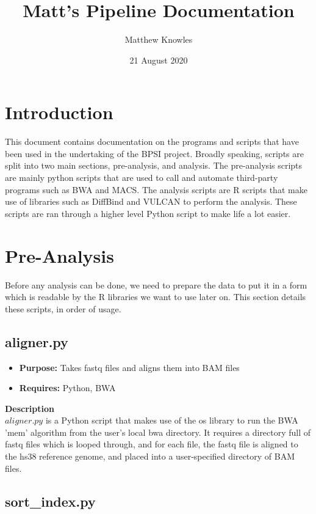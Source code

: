 \documentclass{amsart}
\title{Matt's Pipeline Documentation}
\author{Matthew Knowles}
\date{21 August 2020}
\begin{document}
\maketitle

\tableofcontents

\section{Introduction}
This document contains documentation on the programs and scripts that have been used in the undertaking of the BPSI project. Broadly speaking, scripts are split into two main sections, pre-analysis, and analysis. The pre-analysis scripts are mainly python scripts that are used to call and automate third-party programs such as BWA and MACS. The analysis scripts are R scripts that make use of libraries such as DiffBind and VULCAN to perform the analysis. These scripts are ran through a higher level Python script to make life a lot easier.

\section{Pre-Analysis}

Before any analysis can be done, we need to prepare the data to put it in a form which is readable by the R libraries we want to use later on. This section details these scripts, in order of usage.

\subsection{aligner.py}
    
    \begin{itemize}
        \item \textbf{Purpose: } Takes fastq files and aligns them into BAM files 
        \item \textbf{Requires: } Python, BWA
    \end{itemize}
    \textbf{Description} \\
    $aligner.py$ is a Python script that makes use of the os library to run the BWA 'mem' algorithm from the user's local bwa directory. It requires a directory full of fastq files which is looped through, and for each file, the fastq file is aligned to the hs38 reference genome, and placed into a user-specified directory of BAM files.

\subsection{sort\_index.py}
\end{document}
